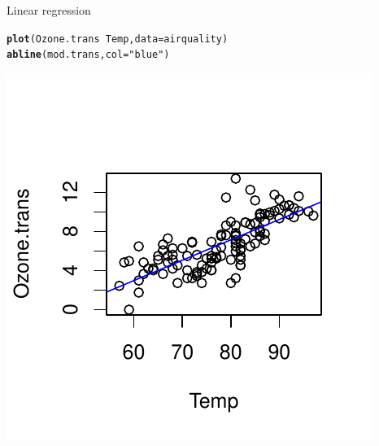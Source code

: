 \documentclass[10pt,xcolor=dvipsnames]{beamer}\usepackage[]{graphicx}\usepackage[]{color}
\makeatletter
\def\maxwidth{ %
  \ifdim\Gin@nat@width>\linewidth
    \linewidth
  \else
    \Gin@nat@width
  \fi
}
\newcommand{\hlstr}[1]{\textcolor[rgb]{0.192,0.494,0.8}{#1}}%
\newcommand{\hlopt}[1]{\textcolor[rgb]{0,0,0}{#1}}%
\newcommand{\hlstd}[1]{\textcolor[rgb]{0.345,0.345,0.345}{#1}}%
\newcommand{\hlkwc}[1]{\textcolor[rgb]{0.333,0.667,0.333}{#1}}%
\newcommand{\hlkwd}[1]{\textcolor[rgb]{0.737,0.353,0.396}{\textbf{#1}}}%
\newenvironment{kframe}{%
 \def\at@end@of@kframe{}%
 \ifinner\ifhmode%
  \def\at@end@of@kframe{\end{minipage}}%
  \begin{minipage}{\columnwidth}%
 \fi\fi%
 \def\FrameCommand##1{\hskip\@totalleftmargin \hskip-\fboxsep
 \colorbox{shadecolor}{##1}\hskip-\fboxsep
     \hskip-\linewidth \hskip-\@totalleftmargin \hskip\columnwidth}%
 \MakeFramed {\advance\hsize-\width
   \@totalleftmargin\z@ \linewidth\hsize
   \@setminipage}}%
 {\par\unskip\endMakeFramed%
 \at@end@of@kframe}
\newenvironment{knitrout}{}{} %
\makeatother
\begin{document}
\begin{frame}[fragile]{Linear regression}

\begin{knitrout}
\color{fgcolor}\begin{kframe}
\begin{alltt}
\hlkwd{plot}\hlstd{(Ozone.trans} \hlopt{~} \hlstd{Temp,} \hlkwc{data}\hlstd{=airquality)}
\hlkwd{abline}\hlstd{(mod.trans,} \hlkwc{col}\hlstd{=}\hlstr{"blue"}\hlstd{)}
\end{alltt}
\end{kframe}
\includegraphics[width=\maxwidth]{figure/linerizationFig-1} 

\end{knitrout}
\end{frame}
\end{document}
